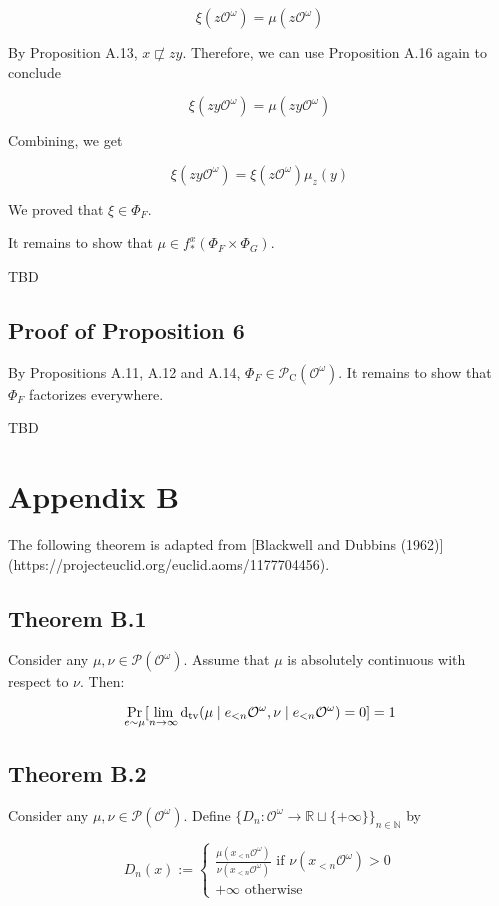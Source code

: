 \documentclass[a4paper]{article}
\DeclareMathOperator{\Prb}{Pr}
\newcommand{\Dtv}{\operatorname{d}_{\textnormal{tv}}}
\newcommand{\Nats}{\mathbb{N}}
\newcommand{\Reals}{\mathbb{R}}
\newcommand{\Prob}{\mathcal{P}}
\newcommand{\Obs}{\mathcal{O}}
\newcommand{\ObsO}{\Obs^\omega}
\newcommand{\CC}{\mathcal{P}_{\operatorname{C}}}
\begin{document}
$$\xi(z\ObsO)=\mu(z\ObsO)$$

By Proposition A.13, ${x \not\sqsubset zy}$. Therefore, we can use Proposition A.16 again to conclude

$$\xi(zy\ObsO)=\mu(zy\ObsO)$$

Combining, we get

$$\xi(zy\ObsO) = \xi(z\ObsO) \mu_z(y)$$

We proved that ${\xi \in \Phi_F}$.

It remains to show that ${\mu \in f_*^x(\Phi_F \times \Phi_G)}$.

TBD

\subsection{Proof of Proposition 6}

By Propositions A.11, A.12 and A.14, ${\Phi_F \in \CC(\ObsO)}$. It remains to show that ${\Phi_F}$ factorizes everywhere.

TBD

\section{Appendix B}

The following theorem is adapted from [Blackwell and Dubbins (1962)](https://projecteuclid.org/euclid.aoms/1177704456).

\subsection{Theorem B.1}

Consider any ${\mu, \nu \in \Prob(\ObsO)}$. Assume that ${\mu}$ is absolutely continuous with respect to ${\nu}$. Then:

$$\Prb_{e \sim \mu}[\lim_{n \rightarrow \infty} \Dtv(\mu \mid e_{<n}\ObsO, \nu \mid e_{<n}\ObsO) = 0] = 1$$

\subsection{Theorem B.2}

Consider any ${\mu, \nu \in \Prob(\ObsO)}$. Define ${\{D_n: \ObsO \rightarrow \Reals \sqcup \{+\infty\}\}_{n \in \Nats}}$ by

$$D_n(x):=\begin{cases}\frac{\mu(x_{<n}\ObsO)}{\nu(x_{<n}\ObsO)} \text{ if } \nu(x_{<n}\ObsO) > 0\\+\infty \text{ otherwise}\end{cases}$$
\end{document}
